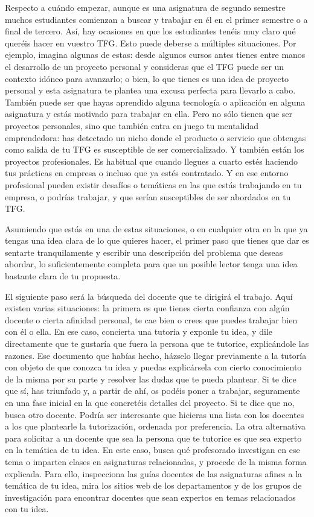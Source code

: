 Respecto a cuándo empezar, aunque es una asignatura de segundo semestre muchos estudiantes comienzan a buscar y trabajar en él en el primer semestre o a final de tercero. Así, hay ocasiones en que los estudiantes tenéis muy claro qué queréis hacer en vuestro TFG. Esto puede deberse a múltiples situaciones. Por ejemplo, imagina algunas de estas: desde algunos cursos antes tienes entre manos el desarrollo de un proyecto personal y consideras que el TFG puede ser un contexto idóneo para avanzarlo; o bien, lo que tienes es una idea de proyecto personal y esta asignatura te plantea una excusa perfecta para llevarlo a cabo. También puede ser que hayas aprendido alguna tecnología o aplicación en alguna asignatura y estás motivado para trabajar en ella. Pero no sólo tienen que ser proyectos personales, sino que también entra en juego tu mentalidad emprendedora: has detectado un nicho donde el producto o servicio que obtengas como salida de tu TFG es susceptible de ser comercializado. Y también están los proyectos profesionales. Es habitual que cuando llegues a cuarto estés haciendo tus prácticas en empresa o incluso que ya estés contratado. Y en ese entorno profesional pueden existir desafíos o temáticas en las que estás trabajando en tu empresa, o podrías trabajar, y que serían susceptibles de ser abordados en tu TFG.

Asumiendo que estás en una de estas situaciones, o en cualquier otra en la que ya tengas una idea clara de lo que quieres hacer, el primer paso que tienes que dar es sentarte tranquilamente y escribir una descripción del problema que deseas abordar, lo suficientemente completa para que un posible lector tenga una idea bastante clara de tu propuesta. 

El siguiente paso será la búsqueda del docente que te dirigirá el trabajo. Aquí existen varias situaciones: la primera es que tienes cierta confianza con algún docente o cierta afinidad personal, te cae bien o crees que puedes trabajar bien con él o ella. En ese caso, concierta una tutoría y exponle tu idea, y dile directamente que te gustaría que fuera la persona que te tutorice, explicándole las razones. Ese documento que habías hecho, házselo llegar previamente a la tutoría con objeto de que conozca tu idea y puedas explicársela con cierto conocimiento de la misma por su parte y resolver las dudas que te pueda plantear. Si te dice que sí, has triunfado y, a partir de ahí, os podéis poner a trabajar, seguramente en una fase inicial en la que concretéis detalles del proyecto. Si te dice que no, busca otro docente. Podría ser interesante que hicieras una lista con los docentes a los que plantearle la tutorización, ordenada por preferencia. La otra alternativa para solicitar a un docente que sea la persona que te tutorice es que sea experto en la temática de tu idea. En este caso, busca qué profesorado investigan en ese tema o imparten clases en asignaturas relacionadas, y procede de la misma forma explicada. Para ello, inspecciona las guías docentes de las asignaturas afines a la temática de tu idea, mira los sitios web de los departamentos y de los grupos de investigación para encontrar docentes que sean expertos en temas relacionados con tu idea. 

